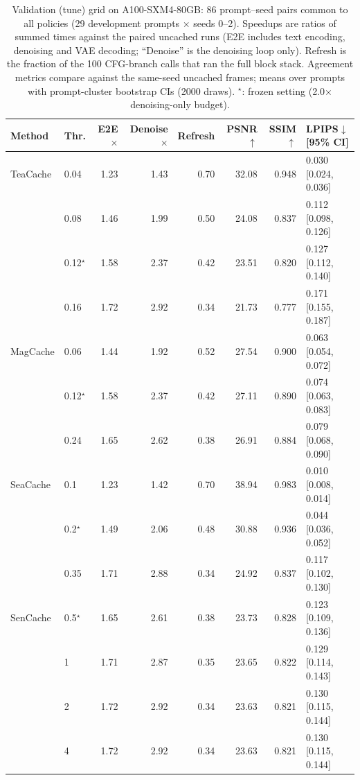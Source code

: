 \begin{table}[htbp]\centering\small
\begin{tabular}{@{}llrrrrrl@{}}\toprule
Method & Thr. & E2E $\times$ & Denoise $\times$ & Refresh & PSNR$\uparrow$ & SSIM$\uparrow$ & LPIPS$\downarrow$ [95\% CI]\\\midrule
TeaCache & 0.04 & 1.23 & 1.43 & 0.70 & 32.08 & 0.948 & 0.030 [0.024, 0.036] \\
 & 0.08 & 1.46 & 1.99 & 0.50 & 24.08 & 0.837 & 0.112 [0.098, 0.126] \\
 & 0.12$^\star$ & 1.58 & 2.37 & 0.42 & 23.51 & 0.820 & 0.127 [0.112, 0.140] \\
 & 0.16 & 1.72 & 2.92 & 0.34 & 21.73 & 0.777 & 0.171 [0.155, 0.187] \\
\addlinespace
MagCache & 0.06 & 1.44 & 1.92 & 0.52 & 27.54 & 0.900 & 0.063 [0.054, 0.072] \\
 & 0.12$^\star$ & 1.58 & 2.37 & 0.42 & 27.11 & 0.890 & 0.074 [0.063, 0.083] \\
 & 0.24 & 1.65 & 2.62 & 0.38 & 26.91 & 0.884 & 0.079 [0.068, 0.090] \\
\addlinespace
SeaCache & 0.1 & 1.23 & 1.42 & 0.70 & 38.94 & 0.983 & 0.010 [0.008, 0.014] \\
 & 0.2$^\star$ & 1.49 & 2.06 & 0.48 & 30.88 & 0.936 & 0.044 [0.036, 0.052] \\
 & 0.35 & 1.71 & 2.88 & 0.34 & 24.92 & 0.837 & 0.117 [0.102, 0.130] \\
\addlinespace
SenCache & 0.5$^\star$ & 1.65 & 2.61 & 0.38 & 23.73 & 0.828 & 0.123 [0.109, 0.136] \\
 & 1 & 1.71 & 2.87 & 0.35 & 23.65 & 0.822 & 0.129 [0.114, 0.143] \\
 & 2 & 1.72 & 2.92 & 0.34 & 23.63 & 0.821 & 0.130 [0.115, 0.144] \\
 & 4 & 1.72 & 2.92 & 0.34 & 23.63 & 0.821 & 0.130 [0.115, 0.144] \\
\bottomrule\end{tabular}
\caption{Validation (tune) grid on A100-SXM4-80GB: 86 prompt--seed pairs common to all policies (29 development prompts
$\times$ seeds 0--2). Speedups are ratios of summed times against the paired uncached runs (E2E includes text encoding,
denoising and VAE decoding; ``Denoise'' is the denoising loop only). Refresh is the fraction of the 100 CFG-branch calls
that ran the full block stack. Agreement metrics compare against the same-seed uncached frames; means over prompts with
prompt-cluster bootstrap CIs (2000 draws). $^\star$: frozen setting (2.0$\times$ denoising-only budget).}
\label{tab:grid}\end{table}
